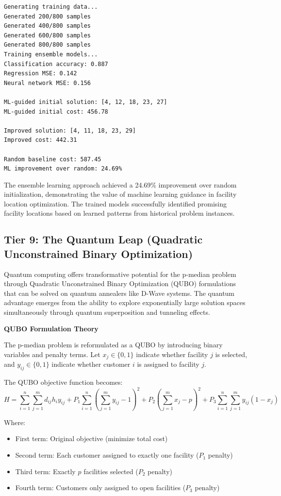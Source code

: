 \documentclass{article}
\begin{document}
\begin{verbatim}
Generating training data...
Generated 200/800 samples
Generated 400/800 samples
Generated 600/800 samples
Generated 800/800 samples
Training ensemble models...
Classification accuracy: 0.887
Regression MSE: 0.142
Neural network MSE: 0.156

ML-guided initial solution: [4, 12, 18, 23, 27]
ML-guided initial cost: 456.78

Improved solution: [4, 11, 18, 23, 29]
Improved cost: 442.31

Random baseline cost: 587.45
ML improvement over random: 24.69%
\end{verbatim}

The ensemble learning approach achieved a 24.69\% improvement over random initialization, demonstrating the value of machine learning guidance in facility location optimization. The trained models successfully identified promising facility locations based on learned patterns from historical problem instances.

\subsection{Tier 9: The Quantum Leap (Quadratic Unconstrained Binary Optimization)}

Quantum computing offers transformative potential for the p-median problem through Quadratic Unconstrained Binary Optimization (QUBO) formulations that can be solved on quantum annealers like D-Wave systems. The quantum advantage emerges from the ability to explore exponentially large solution spaces simultaneously through quantum superposition and tunneling effects.

\textbf{QUBO Formulation Theory}

The p-median problem is reformulated as a QUBO by introducing binary variables and penalty terms. Let \(x_j \in \{0,1\}\) indicate whether facility \(j\) is selected, and \(y_{ij} \in \{0,1\}\) indicate whether customer \(i\) is assigned to facility \(j\).

The QUBO objective function becomes:
\[H = \sum_{i=1}^n \sum_{j=1}^m d_{ij} h_i y_{ij} + P_1 \sum_{i=1}^n \left(\sum_{j=1}^m y_{ij} - 1\right)^2 + P_2 \left(\sum_{j=1}^m x_j - p\right)^2 + P_3 \sum_{i=1}^n \sum_{j=1}^m y_{ij}(1-x_j)\]

Where:
\begin{itemize}
\item First term: Original objective (minimize total cost)
\item Second term: Each customer assigned to exactly one facility (\(P_1\) penalty)
\item Third term: Exactly \(p\) facilities selected (\(P_2\) penalty)  
\item Fourth term: Customers only assigned to open facilities (\(P_3\) penalty)
\end{itemize}
\end{document}
